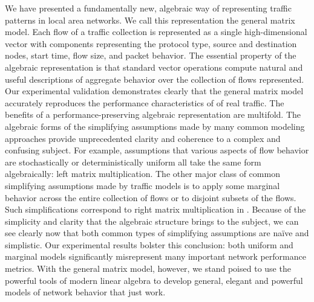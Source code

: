 \documentclass[twocolumn,final]{svjour3}
\begin{document}

We have presented a fundamentally new, algebraic way of representing traffic patterns in local area networks. We call this representation the general matrix model. Each flow of a traffic collection is represented as a single high-dimensional vector with components representing the  protocol type, source and destination nodes, start time, flow size, and packet behavior. The essential property of the algebraic representation is that standard vector operations compute natural and useful descriptions of aggregate behavior over the collection of flows represented. Our experimental validation demonstrates clearly that the general matrix model accurately reproduces the performance characteristics of of real traffic. The benefits of a performance-preserving algebraic representation are multifold. The algebraic forms of the simplifying assumptions made by many common modeling approaches provide unprecedented clarity and coherence to a complex and confusing subject. For example, assumptions that various aspects of flow behavior are stochastically or deterministically uniform all take the same form algebraically: left matrix multiplication. The other major class of common simplifying assumptions made by traffic models is to apply some marginal behavior across the entire collection of flows or to disjoint subsets of the flows. Such simplifications correspond to right matrix multiplication in . Because of the simplicity and clarity that the algebraic structure brings to the subject, we can see clearly now that both common types of simplifying assumptions are na\"ive and simplistic. Our experimental results bolster this conclusion: both uniform and marginal models significantly misrepresent many important network performance metrics. With the general matrix model, however, we stand poised to use the powerful tools of modern linear algebra to develop general, elegant and powerful models of network behavior that just work.
\end{document}
